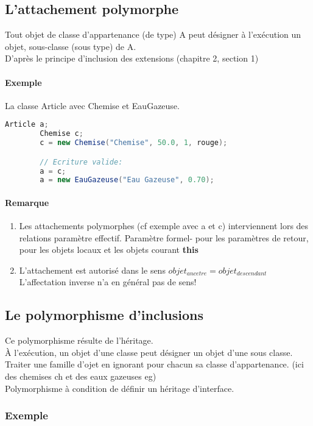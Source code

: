 \subsection{L'attachement polymorphe}
Tout objet de classe d'appartenance (de type) A peut désigner à l'exécution un objet, 
sous-classe (sous type) de A. \\D'après le principe d'inclusion des extensions (chapitre 2, section 1) 
\paragraph{Exemple}
	La classe Article avec Chemise et EauGazeuse.
	\begin{lstlisting}[language=java]
		Article a;
		Chemise c;
		c = new Chemise("Chemise", 50.0, 1, rouge);

		// Ecriture valide: 
		a = c;
		a = new EauGazeuse("Eau Gazeuse", 0.70);
	\end{lstlisting}

	\paragraph{Remarque}
	\begin{enumerate}
		\item Les attachements polymorphes (cf exemple avec a et c) interviennent lors des relations paramètre effectif.
	Paramètre formel- pour les paramètres de retour, pour les objets locaux et les objets courant \textbf{this}
		\item L'attachement est autorisé dans le sens $objet_{ancetre} = objet_{descendant}$
	L'affectation inverse n'a en général pas de sens!
	\end{enumerate}
	\subsection{Le polymorphisme d'inclusions}
	Ce polymorphisme résulte de l'héritage.\\
	À l'exécution, un objet d'une classe peut désigner un objet d'une sous classe.
	Traiter une famille d'ojet en ignorant pour chacun sa classe d'appartenance. (ici des chemises ch et des eaux gazeuses eg)\\
	Polymorphisme à condition de définir un héritage d'interface.\\
	\begin{center}  \end{center}
	\subsubsection{Exemple}
